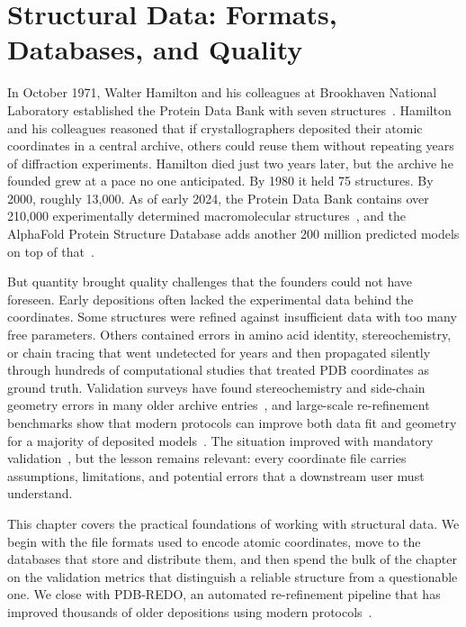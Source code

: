 \chapter{Structural Data: Formats, Databases, and Quality}
\label{ch:data-quality}

In October 1971, Walter Hamilton and his colleagues at Brookhaven National Laboratory
established the Protein Data Bank with seven structures~\cite{bernstein1977,berman2000}.
Hamilton and his colleagues reasoned that if crystallographers deposited their atomic coordinates
in a central archive, others could reuse them without repeating years of diffraction
experiments. Hamilton died just two years later, but the archive he founded grew
at a pace no one anticipated. By 1980 it held 75 structures. By 2000, roughly
13{,}000. As of early 2024, the Protein Data Bank contains over 210{,}000
experimentally determined macromolecular structures~\cite{burley2023}, and the AlphaFold Protein
Structure Database adds another 200 million predicted models on top of that~\cite{varadi2022,tunyasuvunakool2021}.

But quantity brought quality challenges that the founders could not have foreseen.
Early depositions often lacked the experimental data behind the coordinates. Some
structures were refined against insufficient data with too many free parameters.
Others contained errors in amino acid identity, stereochemistry, or chain
tracing that went undetected for years and then propagated silently through
hundreds of computational studies that treated PDB coordinates as ground truth.
Validation surveys have found stereochemistry and side-chain geometry errors in many
older archive entries~\cite{hooft1996}, and large-scale re-refinement benchmarks
show that modern protocols can improve both data fit and geometry for a majority
of deposited models~\cite{joosten2009}.
The situation improved with mandatory validation~\cite{gore2017}, but the lesson remains
relevant: every coordinate file carries assumptions, limitations, and potential
errors that a downstream user must understand.

This chapter covers the practical foundations of working with structural data.
We begin with the file formats used to encode atomic coordinates, move to the
databases that store and distribute them, and then spend the bulk of the chapter
on the validation metrics that distinguish a reliable structure from a
questionable one. We close with PDB-REDO, an automated re-refinement pipeline
that has improved thousands of older depositions using modern protocols~\cite{joosten2012actad,joosten2009}.



